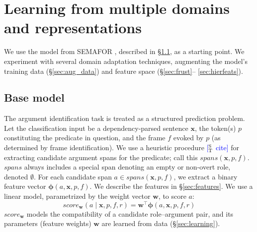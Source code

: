 \documentclass[11pt,a4paper]{article}
\newcommand{\ensuretext}[1]{#1}
\newcommand{\stmarker}{\ensuretext{\textcolor{blue}{\ensuremath{^{\textsc{S}}_{\textsc{T}}}}}}
\newcommand{\arkcomment}[3]{\ensuretext{\textcolor{#3}{[#1 #2]}}}
\newcommand{\st}[1]{\arkcomment{\stmarker}{#1}{blue}}
\begin{document}
\section{Learning from multiple domains and representations}

We use the model from SEMAFOR \citep{das-14}, described in \S\ref{sec:base_model}, as a starting point.
We experiment with several domain adaptation techniques, augmenting the model's training data (\S\ref{sec:aug_data}) and feature space %
(\S\ref{sec:frust}--%
\ref{sec:hierfeats}).


\subsection{Base model}
\label{sec:base_model}

The argument identification task is treated as a structured prediction problem.
Let the classification input be a dependency-parsed sentence $\mathbf{x}$, 
the token(s) $p$ constituting the predicate in question, and the frame $f$ evoked by $p$
(as determined by frame identification). 
We use a heuristic procedure \st{cite} for extracting candidate argument spans 
for the predicate; call this $\textit{spans}(\mathbf{x}, p, f)$.
$\textit{spans}$ always includes a special span denoting an empty or non-overt role, denoted $\emptyset$. 
For each candidate span $a \in \textit{spans}(\mathbf{x}, p, f)$, we extract a binary feature vector 
$\mathbf{\phi}(a, \mathbf{x}, p, f)$.
We describe the features in \S\ref{sec:features}.
We use a linear model, parametrized by the weight vector $\mathbf{w}$, to score $a$:
\begin{equation}
\textit{score}_\mathbf{w}(a \mid \mathbf{x}, p, f, r) = \mathbf{w}^\top \mathbf{\phi}(a, \mathbf{x}, p, f, r)
\end{equation}
$\textit{score}_\mathbf{w}$ models the compatibility  of a candidate
role--argument pair, and its parameters (feature weights) $\mathbf{w}$ are
learned from data (\S\ref{sec:learning}).
\end{document}
